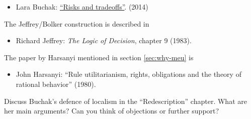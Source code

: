 \begin{itemize}
\item Lara Buchak: \href{https://philosophy.berkeley.edu/file/754/Buchak_Risk_and_Tradeoffs.pdf}{``Risks and tradeoffs''}. (2014)
\end{itemize}

The Jeffrey/Bolker construction is described in
\begin{itemize}
\item Richard Jeffrey: \emph{The Logic of Decision}, chapter 9 (1983).
\end{itemize}

The paper by Harsanyi mentioned in section \ref{sec:why-meu} is
\begin{itemize}
\item John Harsanyi: ``Rule utilitarianism, rights, obligations and the theory of rational behavior'' (1980).
\end{itemize}

\begin{essay}
  Discuss Buchak's defence of localism in the ``Redescription''
  chapter. What are her main arguments? Can you think of objections or
  further support?
\end{essay}

